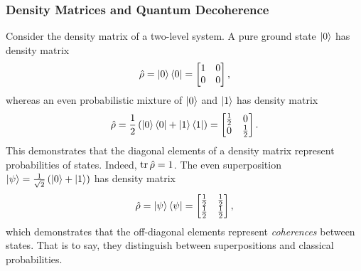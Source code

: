 \subsubsection{Density Matrices and Quantum Decoherence}
Consider the density matrix of a two-level system. A pure ground state $\left|0\right\rangle$ has density matrix
\begin{equation}
    \hat{\rho} = \left|0\right\rangle\left\langle0\right| =
    \begin{bmatrix}
        1 & 0\\
        0 & 0
    \end{bmatrix},
\end{equation}
whereas an even probabilistic mixture of $\left|0\right\rangle$ and $\left|1\right\rangle$ has density matrix
\begin{equation}
    \hat{\rho} = \frac{1}{2}\left(\left|0\right\rangle\left\langle0\right|+\left|1\right\rangle\left\langle1\right|\right) =
    \begin{bmatrix}
        \frac{1}{2} & 0\\
        0 & \frac{1}{2}
    \end{bmatrix}.
\end{equation}
This demonstrates that the diagonal elements of a density matrix represent probabilities of states. Indeed, $\operatorname{tr}\hat{\rho}=1$. The even superposition $\left|\psi\right\rangle = \frac{1}{\sqrt{2}}\left(\left|0\right\rangle+\left|1\right\rangle\right)$ has density matrix
\begin{equation}
    \hat{\rho} = \left|\psi\right\rangle\left\langle\psi\right| =
    \begin{bmatrix}
        \frac{1}{2} & \frac{1}{2}\\
        \frac{1}{2} & \frac{1}{2}
    \end{bmatrix},
\end{equation}
which demonstrates that the off-diagonal elements represent \textit{coherences} between states. That is to say, they distinguish between superpositions and classical probabilities.

